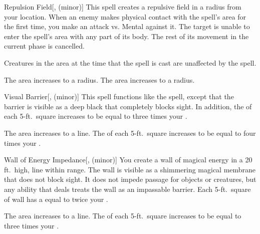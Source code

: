 \lowercase{\hypertarget{spell:Repulsion Field}{}}\label{spell:Repulsion Field}
\begin{freeability}[Rank 3]{\hypertarget{spell:Repulsion Field}{Repulsion Field}}[,  (minor)]
This spell creates a repulsive field in a \areamed radius  from your location.
When an enemy makes physical contact with the spell's area for the first time, you make an attack vs. Mental against it.
\hit The target is unable to enter the spell's area with any part of its body.
The rest of its movement in the current phase is cancelled.

Creatures in the area at the time that the spell is cast are unaffected by the spell.

\rankline
{} The area increases to a \arealarge radius.
 The area increases to a \areahuge radius.
\end{freeability}
\vspace{0.25em}



\lowercase{\hypertarget{spell:Visual Barrier}{}}\label{spell:Visual Barrier}
\begin{freeability}[Rank 3]{\hypertarget{spell:Visual Barrier}{Visual Barrier}}[,  (minor)]
\targetrule
This spell functions like the  spell, except that the barrier is visible as a deep black that completely blocks sight.
In addition, the  of each 5-ft.\ square increases to be equal to three times your .

 The area increases to a \arealarge line.
 The  of each 5-ft.\ square increases to be equal to four times your .
\end{freeability}
\vspace{0.25em}



\lowercase{\hypertarget{spell:Wall of Energy Impedance}{}}\label{spell:Wall of Energy Impedance}
\begin{freeability}[Rank 3]{\hypertarget{spell:Wall of Energy Impedance}{Wall of Energy Impedance}}[,  (minor)]
\targetrule
You create a wall of magical energy in a 20 ft.\ high, \areamed line within \rngmed range.
The wall is visible as a shimmering magical membrane that does not block sight.
It does not impede passage for objects or creatures, but any ability that deals  treats the wall as an impassable barrier.
Each 5-ft.\ square of wall has a  equal to twice your .

\rankline
{} The area increases to a \arealarge line.
 The  of each 5-ft.\ square increases to be equal to three times your .
\end{freeability}
\vspace{0.25em}



